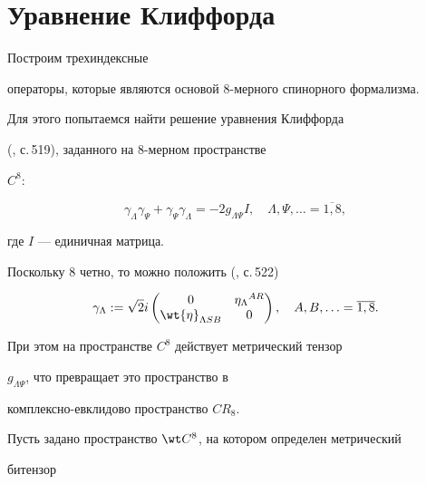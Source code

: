 \section{Уравнение Клиффорда}





Построим трехиндексные


операторы, которые являются основой 8-мерного спинорного формализма.


Для этого попытаемся найти решение уравнения Клиффорда


(\cite{Penrose1}, с.\,519), заданного на 8-мерном пространстве


$C^8$:


\begin{equation}


\label{e1}


\gamma_\Lambda\gamma_\Psi+\gamma_\Psi\gamma_\Lambda=-2g_{\Lambda\Psi}I,\quad


\Lambda,\Psi,\dotsc=\overline{1,8},


\end{equation}


где $I$ --- единичная матрица.


Поскольку 8 четно, то можно положить (\cite{Penrose1}, с.\,522)


\begin{equation}


\label{e2}


\gamma_\Lambda:=\sqrt{2} i


\begin{pmatrix}


0 & \eta_\Lambda{}^{AR}\\


\wt{\eta}_{\Lambda SB} & 0


\end{pmatrix}


,\quad A,B,\dotsc=\overline{1,8}.


\end{equation}


При этом на пространстве $C^8$ действует метрический тензор


$g_{\Lambda\Psi}$, что превращает это пространство в


комплексно-евклидово пространство $CR_8$.


Пусть задано пространство $\wt C^8$, на котором определен метрический


битензор


$$


